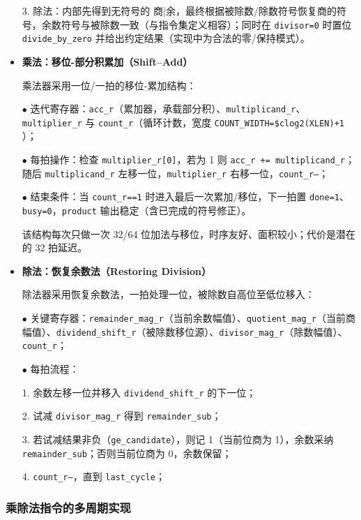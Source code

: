 \documentclass[11pt]{article}
\begin{document}
\begin{itemize}
3. 除法：内部先得到无符号的 商|余，最终根据被除数/除数符号恢复商的符号，余数符号与被除数一致（与指令集定义相容）；同时在 \texttt{divisor=0} 时置位 \texttt{divide\_by\_zero} 并给出约定结果（实现中为合法的零/保持模式）。

\item \textbf{乘法：移位-部分积累加（Shift–Add）}
    
乘法器采用一位/一拍的移位-累加结构：

$\bullet$ 迭代寄存器：\texttt{acc\_r}（累加器，承载部分积）、\texttt{multiplicand\_r}、\texttt{multiplier\_r} 与 \texttt{count\_r}（循环计数，宽度 \texttt{COUNT\_WIDTH=\$clog2(XLEN)+1} ）；

$\bullet$ 每拍操作：检查 \texttt{multiplier\_r[0]}，若为 1 则 \texttt{acc\_r += multiplicand\_r}；随后 \texttt{multiplicand\_r} 左移一位，\texttt{multiplier\_r} 右移一位，\texttt{count\_r--}；

$\bullet$ 结束条件：当 \texttt{count\_r==1} 时进入最后一次累加/移位，下一拍置 \texttt{done=1}、\texttt{busy=0}，\texttt{product} 输出稳定（含已完成的符号修正）。

该结构每次只做一次 32/64 位加法与移位，时序友好、面积较小；代价是潜在的 32 拍延迟。

\item \textbf{除法：恢复余数法（Restoring Division）}

除法器采用恢复余数法，一拍处理一位，被除数自高位至低位移入：

$\bullet$ 关键寄存器：\texttt{remainder_mag_r}（当前余数幅值）、\texttt{quotient_mag_r}（当前商幅值）、\texttt{dividend_shift_r}（被除数移位源）、\texttt{divisor_mag_r}（除数幅值）、\texttt{count\_r}；

$\bullet$ 每拍流程：

\hspace{2em} 1. 余数左移一位并移入 \texttt{dividend\_shift\_r} 的下一位；

\hspace{2em} 2. 试减 \texttt{divisor\_mag\_r} 得到 \texttt{remainder\_sub}；

\hspace{2em} 3. 若试减结果非负（\texttt{ge\_candidate}），则记 1（当前位商为 1），余数采纳 \texttt{remainder\_sub}；否则当前位商为 0，余数保留；

\hspace{2em} 4. \texttt{count\_r--}，直到 \texttt{last\_cycle}；

\end{itemize}

\subsubsection{乘除法指令的多周期实现}
\end{document}
